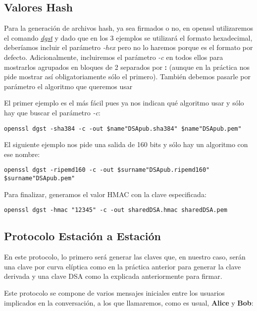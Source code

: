 \documentclass[a4paper, 11pt]{article}
\begin{document}
	\subsection{Valores Hash}
		Para la generación de archivos hash, ya sea firmados o no, en openssl utilizaremos el comando
		\href{https://www.openssl.org/docs/man1.0.2/apps/dgst.html}{\textit{dgst}} y dado que en los 3 ejemplos
		se utilizará el formato hexadecimal, deberíamos incluir el parámetro \textit{-hex} pero no lo haremos
		porque es el formato por defecto. Adicionalmente, incluiremos el parámetro \textit{-c} en todos ellos
		para mostrarlos agrupados en bloques de 2 separados por \textbf{:} (aunque en la práctica nos pide mostrar
		así obligatoriamente sólo el primero). También debemos pasarle por parámetro el algoritmo que queremos usar
		
		El primer ejemplo es el más fácil pues ya nos indican qué algoritmo usar y sólo hay que buscar el parámetro
		\textit{-c}:
		\begin{small}
			\verb|openssl dgst -sha384 -c -out $name"DSApub.sha384" $name"DSApub.pem"|
		\end{small}
		
		El siguiente ejemplo nos pide una salida de 160 bits y sólo hay un algoritmo con ese nombre:
		\begin{small}
			\verb|openssl dgst -ripemd160 -c -out $surname"DSApub.ripemd160" $surname"DSApub.pem"|
		\end{small}
		
		Para finalizar, generamos el valor HMAC con la clave especificada:
		\begin{small}
			\verb|openssl dgst -hmac "12345" -c -out sharedDSA.hmac sharedDSA.pem|
		\end{small}

	\subsection{Protocolo Estación a Estación}
		En este protocolo, lo primero será generar las claves que, en nuestro caso, serán una clave por curva elíptica como
		en la práctica anterior para generar la clave derivada y una clave DSA como la explicada anteriormente para firmar.
		
		Este protocolo se compone de varios mensajes iniciales entre los usuarios implicados en la conversación, a los que
		llamaremos, como es usual, \textbf{Alice} y \textbf{Bob}:
		
\end{document}
